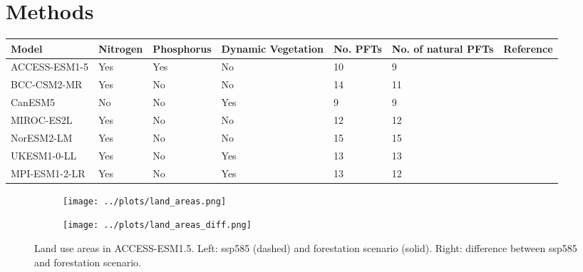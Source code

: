 \documentclass[]{article}
\begin{document}
\section{Methods}

\begin{table}[]
    \begin{tabular}{lllllll}
    \hline
Model         & Nitrogen & Phosphorus & Dynamic Vegetation & No. PFTs & No. of natural PFTs & Reference                                         \\ \hline
ACCESS-ESM1-5 & Yes      & Yes        & No                 & 10       & 9                   & \cite{ziehn_australian_2020}   \\
BCC-CSM2-MR   & Yes      & No         & No                 & 14       & 11                  & \cite{li_development_2019}     \\
CanESM5       & No       & No         & Yes                & 9        & 9                   & \cite{swart_canadian_2019}     \\
MIROC-ES2L    & Yes      & No         & No                 & 12       & 12                  & \cite{hajima_development_2020} \\
NorESM2-LM    & Yes      & No         & No                 & 15       & 15                  & \cite{seland_norwegian_2020}   \\
UKESM1-0-LL   & Yes      & No         & Yes                & 13       & 13                  & \cite{sellar_ukesm1_2019}      \\
MPI-ESM1-2-LR & Yes      & No         & Yes                & 13       & 12                  & \cite{giorgetta_climate_2013}  \\ \hline
\end{tabular}
\end{table}

\begin{figure}[H]
    \centering
    \begin{subfigure}[b]{0.45\linewidth}
        \texttt{[image: ../plots/land\_areas.png]}
    \end{subfigure}
    \begin{subfigure}[b]{0.45\linewidth}
        \texttt{[image: ../plots/land\_areas\_diff.png]}
    \end{subfigure}
    \caption{Land use areas in ACCESS-ESM1.5. Left: ssp585 (dashed) and forestation scenario (solid). Right: difference between ssp585 and forestation scenario.}
    \label{fig:land_use}
\end{figure}
\end{document}
